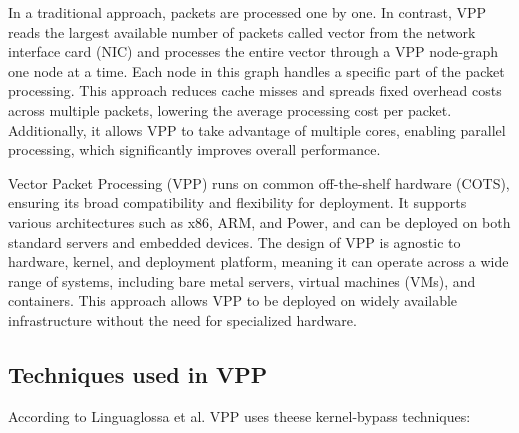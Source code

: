 In a traditional approach, packets are processed one by one. In contrast, VPP reads the largest available number of packets called vector from the network interface card (NIC) 
and processes the entire vector through a VPP node-graph one node at a time. Each node in this graph handles a specific part of the packet processing.
This approach reduces cache misses and spreads fixed overhead costs across multiple packets, lowering the average processing cost per packet. 
Additionally, it allows VPP to take advantage of multiple cores, enabling parallel processing, which significantly improves overall performance.

Vector Packet Processing (VPP) runs on common off-the-shelf hardware (COTS), ensuring its broad compatibility and flexibility for deployment. 
It supports various architectures such as x86, ARM, and Power, and can be deployed on both standard servers and embedded devices. 
The design of VPP is agnostic to hardware, kernel, and deployment platform, meaning it can operate across a wide range of systems, including bare metal servers, virtual machines (VMs), and containers. 
This approach allows VPP to be deployed on widely available infrastructure without the need for specialized hardware.\cite{fdio_what_is_vpp}

\subsection{Techniques used in VPP}
According to Linguaglossa et al.\cite{LINGUAGLOSSA} VPP uses theese kernel-bypass techniques:

